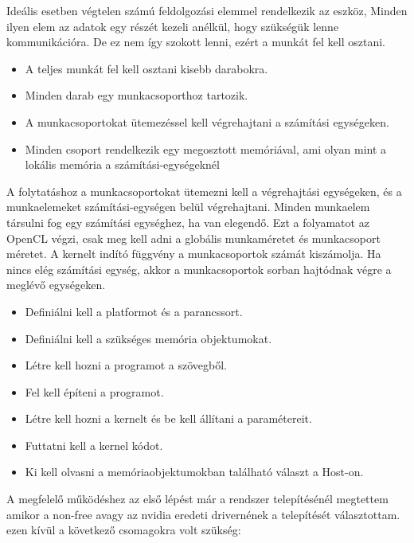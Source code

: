 
Ideális esetben végtelen számú feldolgozási elemmel rendelkezik az eszköz, Minden ilyen elem az adatok egy részét kezeli anélkül, hogy szükségük lenne kommunikációra. De ez nem így szokott lenni, ezért a munkát fel kell osztani.
\begin{itemize}
\item A teljes munkát fel kell osztani kisebb darabokra.
\item Minden darab egy munkacsoporthoz tartozik.
\item A munkacsoportokat ütemezéssel kell végrehajtani a számítási egységeken.
\item Minden csoport rendelkezik egy megosztott memóriával, ami olyan mint a lokális memória a számítási-egységeknél
\end{itemize}

A folytatáshoz a munkacsoportokat ütemezni kell a végrehajtási egységeken, és a munkaelemeket számítási-egységen belül végrehajtani.
Minden munkaelem társulni fog egy számítási egységhez, ha van elegendő. Ezt a folyamatot az OpenCL végzi, csak meg kell adni a globális munkaméretet és munkacsoport méretet. A kernelt indító függvény a  munkacsoportok számát kiszámolja. Ha nincs elég számítási egység, akkor a munkacsoportok sorban hajtódnak végre a meglévő egységeken.

\begin{itemize}
\item Definiálni kell a platformot és a parancssort.
\item Definiálni kell a szükséges memória objektumokat.
\item Létre kell hozni a programot a szövegből.
\item Fel kell építeni a programot.
\item Létre kell hozni a kernelt és be kell állítani a paramétereit.
\item Futtatni kell a kernel kódot.
\item Ki kell olvasni a memóriaobjektumokban található választ a Host-on.

\end{itemize}



A megfelelő működéshez az első lépést már a rendszer telepítésénél megtettem amikor a non-free avagy az nvidia eredeti drivernének a telepítését választottam.
ezen kívül a következő csomagokra volt szükség: 

